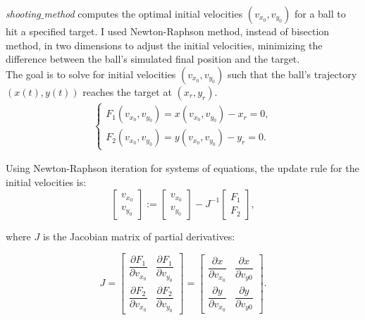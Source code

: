\documentclass{article}
\begin{document}
	\textit{shooting$\_$method} computes the optimal initial velocities $(v_{x_0}, v_{y_0})$ for a ball to hit a specified target. I used Newton-Raphson method, instead of bisection method, in two dimensions to adjust the initial velocities, minimizing the difference between the ball's simulated final position and the target. \\
	
	The goal is to solve for initial velocities $(v_{x_0}, v_{y_0})$ such that the ball's trajectory $(x(t),y(t))$ reaches the target at $(x_r, y_r)$.
	\begin{align*}
		\begin{cases}
			F_1(v_{x_0}, v_{y_0}) = x(v_{x_0}, v_{y_0}) - x_r = 0, \\
			F_2(v_{x_0}, v_{y_0}) = y(v_{x_0}, v_{y_0}) - y_r = 0.
		\end{cases}
	\end{align*}
	
	Using Newton-Raphson iteration for systems of equations, the update rule for the initial velocities is:
	\begin{equation*}
		\begin{bmatrix}
			v_{x_0} \\
			v_{y_0}
		\end{bmatrix}
		:=
		\begin{bmatrix}
			v_{x_0} \\
			v_{y_0}
		\end{bmatrix}
		- J^{-1}
		\begin{bmatrix}
			F_1 \\
			F_2
		\end{bmatrix},
	\end{equation*}
	
	where $J$ is the Jacobian matrix of partial derivatives:
	
	\begin{equation}
		J =
		\begin{bmatrix}
			\dfrac{\partial F_1}{\partial v_{x_0}} & \dfrac{\partial F_1}{\partial v_{y_0}} \\
			\dfrac{\partial F_2}{\partial v_{x_0}} & \dfrac{\partial F_2}{\partial v_{y_0}}
		\end{bmatrix}
		=
		\begin{bmatrix}
			\dfrac{\partial x}{\partial v_{x_0}} & \dfrac{\partial x}{\partial v_{y0}} \\
			\dfrac{\partial y}{\partial v_{x_0}} & \dfrac{\partial y}{\partial v_{y0}}
		\end{bmatrix}.
	\end{equation}
	
\end{document}
